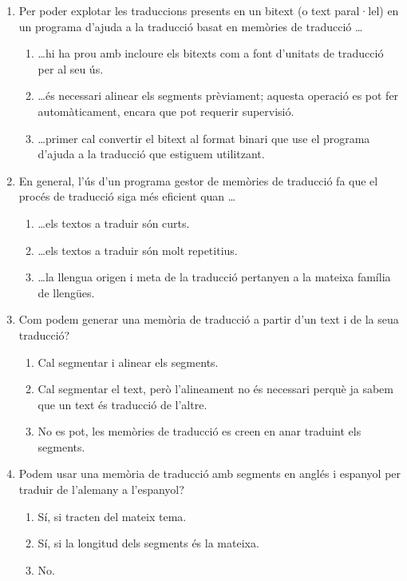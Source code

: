 \begin{enumerate}
\item Per poder explotar les traduccions presents en un bitext (o text
  paral·lel) en un programa d'ajuda a la traducció basat en memòries
  de traducció \ldots 
  \begin{enumerate} 
  \item \ldots hi ha prou amb incloure els bitexts com a font
    d'unitats de traducció per al seu ús.
  \item \ldots és necessari alinear els segments prèviament; aquesta
    operació es pot fer automàticament, encara que pot requerir
    supervisió.
  \item \ldots primer cal convertir el bitext al format binari que use
    el programa d'ajuda a la traducció que estiguem utilitzant.
  \end{enumerate}

\item En general, l'ús d'un programa gestor de memòries de traducció
  fa que el procés de traducció siga més eficient quan \ldots
  \begin{enumerate}
  \item \ldots els textos a traduir són curts.
  \item \ldots els textos a traduir són molt repetitius.
  \item \ldots la llengua origen i meta de la traducció pertanyen a la
    mateixa família de llengües.
  \end{enumerate}

\item Com podem generar una memòria de traducció a partir d'un text i
  de la seua traducció? 
  \begin{enumerate}
  \item Cal segmentar i alinear els segments.
  \item Cal segmentar el text, però l'alineament no és necessari
    perquè ja sabem que un text és traducció de l'altre.
  \item No es pot, les memòries de traducció es creen en anar traduint
    els segments.
  \end{enumerate}

\item Podem usar una memòria de traducció amb segments en anglés i
  espanyol per traduir de l'alemany a l'espanyol? 
  \begin{enumerate}
  \item Sí, si tracten del mateix tema.
  \item Sí, si la longitud dels segments és la mateixa.
  \item No.
  \end{enumerate}
\end{enumerate}

